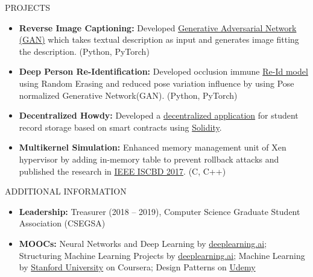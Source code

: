 \documentclass[]{mcdowellcv}
\begin{document}
	\begin{cvsection}{PROJECTS}
		\begin{cvsubsection}{}{}{}
			\begin{itemize}
    			\item \textbf{Reverse Image Captioning:} Developed  \href{https://github.com/aditya30394/Reverse-Image-Captioning}{Generative Adversarial Network (GAN)} which takes textual description as input and generates image fitting the description. (Python, PyTorch)
				\item \textbf{Deep Person Re-Identification:} Developed occlusion immune \href{https://github.com/aditya30394/Person-Re-Identification}{Re-Id model} using Random Erasing and reduced pose variation influence by using Pose normalized Generative Network(GAN). (Python, PyTorch)
				\item \textbf{Decentralized Howdy:} Developed a \href{https://github.com/aditya30394/Decentralized-Howdy}{decentralized application} for student record storage based on smart contracts using \href{https://solidity.readthedocs.io/en/v0.4.24/}{Solidity}.
				\item \textbf{Multikernel Simulation:} Enhanced memory management unit of Xen hypervisor by adding in-memory table to prevent rollback attacks and  published the research in \href{https://ieeexplore.ieee.org/document/8181523/}{IEEE ISCBD 2017}. (C, C++)
			\end{itemize}
		\end{cvsubsection}
	\end{cvsection}
	
	\begin{cvsection}{ADDITIONAL INFORMATION}
		\begin{cvsubsection}{}{}{}	
			\begin{itemize}
				\item \textbf{Leadership:} Treasurer (2018 -- 2019), Computer Science Graduate Student Association (CSEGSA)
				\item \textbf{MOOCs:} Neural Networks and Deep Learning by \href{https://www.coursera.org/account/accomplishments/verify/ZYYLP6LB9HPX}{deeplearning.ai}; Structuring Machine Learning Projects by \href{https://www.coursera.org/account/accomplishments/verify/8G7XPAQQZT28}{deeplearning.ai}; Machine Learning by \href{https://www.coursera.org/account/accomplishments/verify/NQRVPNVBEN4K}{Stanford University} on Coursera; Design Patterns on \href{https://www.udemy.com/certificate/UC-DWASSJ2I/}{Udemy}
			\end{itemize}
		\end{cvsubsection}
	\end{cvsection}
	
	
	
\end{document}
